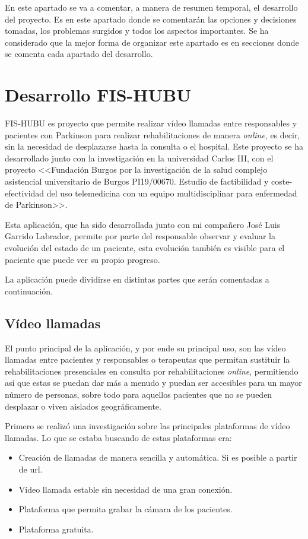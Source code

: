 
En este apartado se va a comentar, a manera de resumen temporal, el desarrollo del proyecto. Es en este apartado donde se comentarán las opciones y decisiones tomadas, los problemas surgidos y todos los aspectos importantes. Se ha considerado que la mejor forma de organizar este apartado es en secciones donde se comenta cada apartado del desarrollo.

\section{Desarrollo FIS-HUBU}\label{desarrolloFH}
FIS-HUBU es proyecto que permite realizar vídeo llamadas entre responsables y pacientes con Parkinson para realizar rehabilitaciones de manera \textit{online}, es decir, sin la necesidad de desplazarse hasta la consulta o el hospital. Este proyecto se ha desarrollado junto con la investigación en la universidad Carlos III, con el proyecto  <<Fundación Burgos por la investigación de la salud complejo asistencial universitario de Burgos PI19/00670. Estudio de factibilidad y coste-efectividad del uso telemedicina con un equipo multidisciplinar para enfermedad de Parkinson>>.

Esta aplicación, que ha sido desarrollada junto con mi compañero José Luis Garrido Labrador, permite por parte del responsable observar y evaluar la evolución del estado de un paciente, esta evolución también es visible para el paciente que puede ver su propio progreso.

La aplicación puede dividirse en distintas partes que serán comentadas a continuación.
\subsection{Vídeo llamadas}
El punto principal de la aplicación, y por ende su principal uso, son las vídeo llamadas entre pacientes y responsables o terapeutas que permitan sustituir la rehabilitaciones presenciales en consulta por rehabilitaciones \textit{online}, permitiendo así que estas se puedan dar más a menudo y puedan ser accesibles para un mayor número de personas, sobre todo para aquellos pacientes que no se pueden desplazar o viven aislados geográficamente.

Primero se realizó una investigación sobre las principales plataformas de vídeo llamadas. Lo que se estaba buscando de estas plataformas era:
\begin{itemize}
	\item Creación de llamadas de manera sencilla y automática. Si es posible a partir de url.
	\item Vídeo llamada estable sin necesidad de una gran conexión.
	\item Plataforma que permita grabar la cámara de los pacientes.
	\item Plataforma gratuita.
\end{itemize}

